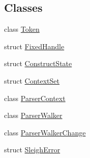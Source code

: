 \subsection*{Classes}
\begin{DoxyCompactItemize}
\item 
class \mbox{\hyperlink{class_token}{Token}}
\item 
struct \mbox{\hyperlink{struct_fixed_handle}{Fixed\+Handle}}
\item 
struct \mbox{\hyperlink{struct_construct_state}{Construct\+State}}
\item 
struct \mbox{\hyperlink{struct_context_set}{Context\+Set}}
\item 
class \mbox{\hyperlink{class_parser_context}{Parser\+Context}}
\item 
class \mbox{\hyperlink{class_parser_walker}{Parser\+Walker}}
\item 
class \mbox{\hyperlink{class_parser_walker_change}{Parser\+Walker\+Change}}
\item 
struct \mbox{\hyperlink{struct_sleigh_error}{Sleigh\+Error}}
\end{DoxyCompactItemize}
